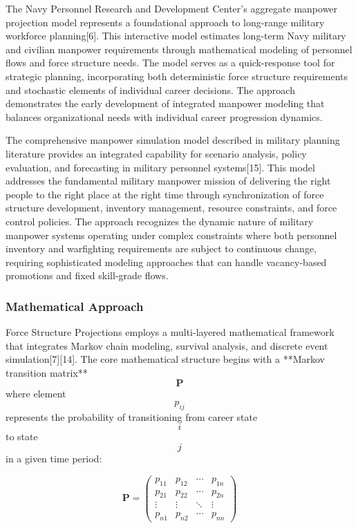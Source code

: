 \documentclass[main.tex]{subfiles}
\begin{document}
The Navy Personnel Research and Development Center's aggregate manpower projection model represents a foundational approach to long-range military workforce planning[6]. This interactive model estimates long-term Navy military and civilian manpower requirements through mathematical modeling of personnel flows and force structure needs. The model serves as a quick-response tool for strategic planning, incorporating both deterministic force structure requirements and stochastic elements of individual career decisions. The approach demonstrates the early development of integrated manpower modeling that balances organizational needs with individual career progression dynamics.

The comprehensive manpower simulation model described in military planning literature provides an integrated capability for scenario analysis, policy evaluation, and forecasting in military personnel systems[15]. This model addresses the fundamental military manpower mission of delivering the right people to the right place at the right time through synchronization of force structure development, inventory management, resource constraints, and force control policies. The approach recognizes the dynamic nature of military manpower systems operating under complex constraints where both personnel inventory and warfighting requirements are subject to continuous change, requiring sophisticated modeling approaches that can handle vacancy-based promotions and fixed skill-grade flows.

\subsubsection{Mathematical Approach}

Force Structure Projections employs a multi-layered mathematical framework that integrates Markov chain modeling, survival analysis, and discrete event simulation[7][14]. The core mathematical structure begins with a **Markov transition matrix** $$\mathbf{P}$$ where element $$p_{ij}$$ represents the probability of transitioning from career state $$i$$ to state $$j$$ in a given time period:

$$\mathbf{P} = \begin{pmatrix}
p_{11} & p_{12} & \cdots & p_{1n} \\
p_{21} & p_{22} & \cdots & p_{2n} \\
\vdots & \vdots & \ddots & \vdots \\
p_{n1} & p_{n2} & \cdots & p_{nn}
\end{pmatrix}$$
\end{document}
